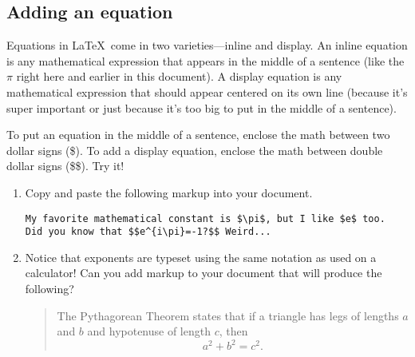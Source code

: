 \subsection*{Adding an equation}

Equations in \LaTeX\ come in two varieties---inline and display.
An inline equation is any mathematical expression that appears in
the middle of a sentence (like the $\pi$ right here and earlier in
this document). A display equation is any mathematical expression
that should appear centered on its own line (because it's super important
or just because it's too big to put in the middle of a sentence).

To put an equation in the middle of a sentence, enclose the math between
two dollar signs (\$). To add a display equation, enclose the math
between double dollar signs (\$\$). Try it!

\begin{enumerate}
\setcounter{enumi}{\value{interitemtemp}}
\item Copy and paste the following markup into your document.
\bigskip

\begin{codeblock}
\begin{verbatim}
My favorite mathematical constant is $\pi$, but I like $e$ too.
Did you know that $$e^{i\pi}=-1?$$ Weird...
\end{verbatim}
\end{codeblock}
\bigskip

\item Notice that exponents are typeset using the same notation as used
on a calculator! Can you add markup to your document that will produce
the following?

\begin{quote}
The Pythagorean Theorem states that if a triangle has legs of lengths
$a$ and $b$ and hypotenuse of length $c$, then
\[
a^{2}+b^{2}=c^{2}.
\]
\end{quote}

\end{enumerate}
